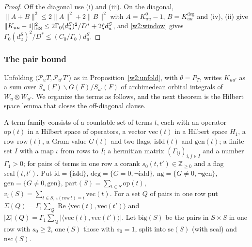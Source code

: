 \begin{proof}
Off the diagonal use (i) and (iii). On the diagonal, $\lVert A+B\rVert^2\le2\lVert A\rVert^2+2\lVert B\rVert^2$ with $A=K^0_{uu}-1$, $B=K^{\deg}_{uu}$ and (iv), (ii) give $\lVert K_{uu}-1\rVert_{\mathrm{HS}}^2\le2\Gamma_0(d^S_u)^2/D^*+2\xi d^S_u$, and \eqref{w2:window} gives $\Gamma_0(d^S_u)^2/D^*\le(C_0/\Gamma_0)d^S_u$.
\end{proof}

\subsubsection{The pair bound}

Unfolding $\langle\mathcal P_uT,\mathcal P_{u'}T'\rangle$ as in Proposition~\ref{w2:unfold}, with $\theta=\overline{P_{T}}$, writes $K_{uu'}$ as a sum over $S_u(F)\backslash G(F)/S_{u'}(F)$ of archimedean orbital integrals of $W_u\otimes\overline{W_{u'}}$. We organize the terms as follows, and the next theorem is the Hilbert space lemma that closes the off-diagonal clause.

\begin{definition}\label{w2:terms}
A term family consists of a countable set of terms $t$, each with an operator $\mathrm{op}(t)$ in a Hilbert space of operators, a vector $\mathrm{vec}(t)$ in a Hilbert space $H_1$, a row $\mathrm{row}(t)$, a Gram value $G(t)$ and two flags, $\mathrm{isId}(t)$ and $\mathrm{gen}(t)$; a finite set $I$ with a map $\iota$ from rows to $I$; a hermitian matrix $(\Gamma_{ij})_{i,j\in I}$ and a number $\Gamma_1>0$; for pairs of terms in one row a corank $s_0(t,t')\in\mathbb Z_{\ge0}$ and a flag $\mathrm{scal}(t,t')$. Put $\mathrm{id}=\{\mathrm{isId}\}$, $\mathrm{deg}=\{G=0,\neg\mathrm{isId}\}$, $\mathrm{ng}=\{G\ne0,\neg\mathrm{gen}\}$, $\mathrm{gen}=\{G\ne0,\mathrm{gen}\}$, $\mathrm{part}(S)=\sum_{t\in S}\mathrm{op}(t)$, $v_i(S)=\sum_{t\in S,\ \iota(\mathrm{row}\,t)=i}\mathrm{vec}(t)$. For a set $Q$ of pairs in one row put $\Sigma(Q)=\Gamma_1\sum_Q\operatorname{Re}\langle\mathrm{vec}(t),\mathrm{vec}(t')\rangle$ and $\lvert\Sigma\rvert(Q)=\Gamma_1\sum_Q\lvert\langle\mathrm{vec}(t),\mathrm{vec}(t')\rangle\rvert$. Let $\mathrm{big}(S)$ be the pairs in $S\times S$ in one row with $s_0\ge2$, $\mathrm{one}(S)$ those with $s_0=1$, split into $\mathrm{sc}(S)$ (with $\mathrm{scal}$) and $\mathrm{nsc}(S)$.
\end{definition}

